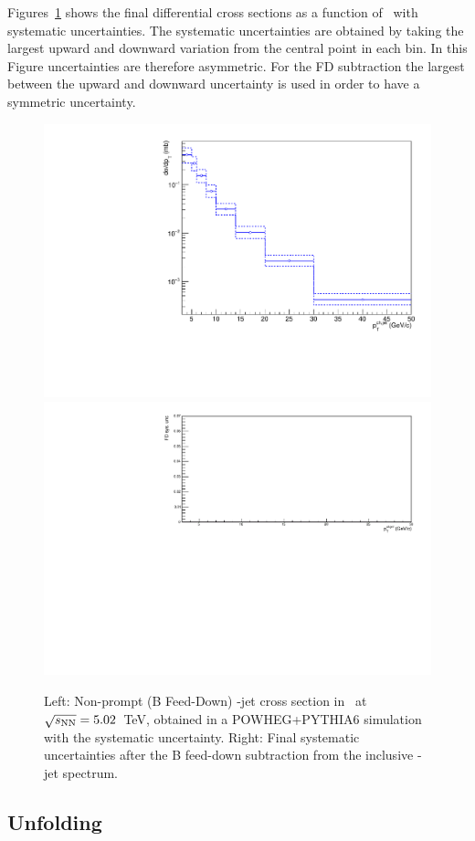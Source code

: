 Figures~\ref{fig:BFeedDown_GeneratorLevel_Spectrum_canvas} shows the final differential cross sections as a function of \ptchjet\ with systematic uncertainties. The systematic uncertainties are obtained by taking the largest upward and downward variation from the central point in each bin. In this Figure uncertainties are therefore asymmetric. For the FD subtraction the largest between the upward and downward uncertainty is used in order to have a symmetric uncertainty.

\begin{figure}[bth]
\begin{center}
\includegraphics[width=.45\textwidth]{pPbplots/simulations/NonPromptspectra_JetPt_Dpt3_36_effScaled_un}
\includegraphics[width=.45\textwidth]{pPbplots/jetSpectra/FDUnc_beforeUnf}
\caption{Left: Non-prompt (B Feed-Down) \Dstar-jet cross section in \pPb\ at $\sqrt{s_{\rm NN}}=5.02$~TeV, obtained in a POWHEG+PYTHIA6 simulation with the systematic uncertainty. Right: Final systematic uncertainties after the B feed-down subtraction from the inclusive \Dstar-jet spectrum. } 
\label{fig:BFeedDown_GeneratorLevel_Spectrum_canvas}
\end{center}
\end{figure}


\subsection{Unfolding}
\label{sUnfoldSys}


